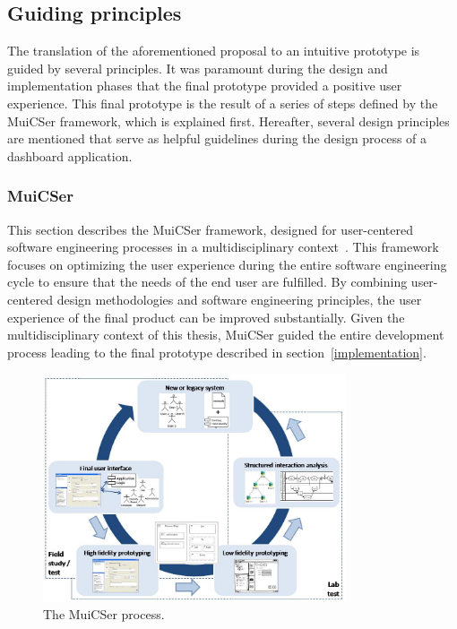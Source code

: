     \subsection{Guiding principles}\label{guiding_principles}

    The translation of the aforementioned proposal to an intuitive prototype is guided by several principles. It was paramount during the design and implementation phases that the final prototype provided a positive user experience. This final prototype is the result of a series of steps defined by the MuiCSer framework, which is explained first. Hereafter, several design principles are mentioned that serve as helpful guidelines during the design process of a dashboard application.

        \subsubsection{MuiCSer}\label{muicser}
        This section describes the MuiCSer framework, designed for user-centered software engineering processes in a multidisciplinary context~\cite{Haesen2008}. This framework focuses on optimizing the user experience during the entire software engineering cycle to ensure that the needs of the end user are fulfilled. By combining user-centered design methodologies and software engineering principles, the user experience of the final product can be improved substantially. Given the multidisciplinary context of this thesis, MuiCSer guided the entire development process leading to the final prototype described in section~\ref{implementation}.
        
        \begin{figure}[!t]
            \centering
            \includegraphics[width=0.8\textwidth]{chapters/3_design/muicser}
            \caption{The MuiCSer process.}\label{fig:muicser}
        \end{figure}

